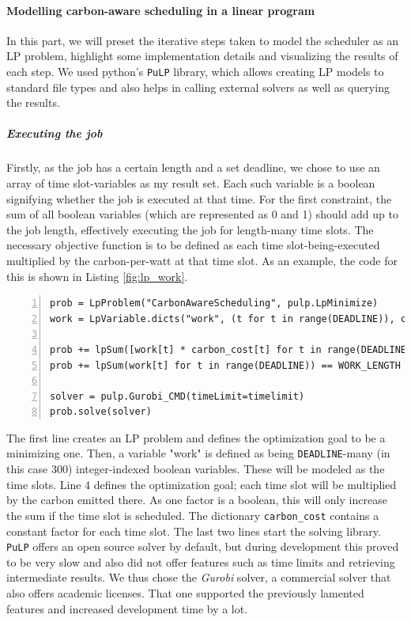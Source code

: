 \paragraph{Modelling carbon-aware scheduling in a linear program}

In this part, we will preset the iterative steps taken to model the scheduler as an LP problem, highlight some implementation details and visualizing the results of each step.
We used python's \verb|PuLP| library, which allows creating LP models to standard file types and also helps in calling external solvers as well as querying the results.

\subparagraph{Executing the job}

Firstly, as the job has a certain length and a set deadline, we chose to use an array of time slot-variables as my result set. Each such variable is a boolean signifying whether the job is executed at that time.
For the first constraint, the sum of all boolean variables (which are represented as 0 and 1) should add up to the job length, effectively executing the job for length-many time slots.
The necessary objective function is to be defined as each time slot-being-executed multiplied by the carbon-per-watt at that time slot.
As an example, the code for this is shown in Listing \ref{fig:lp_work}.

\begin{minipage}{\linewidth}
\begin{lstlisting}[frame=single, numbers=left, caption={LP Implementation for basic scheduling}, label={list:lp_work}, basicstyle=\ttfamily, breaklines]
prob = LpProblem("CarbonAwareScheduling", pulp.LpMinimize)
work = LpVariable.dicts("work", (t for t in range(DEADLINE)), cat="Binary")

prob += lpSum([work[t] * carbon_cost[t] for t in range(DEADLINE)]) 
prob += lpSum(work[t] for t in range(DEADLINE)) == WORK_LENGTH 

solver = pulp.Gurobi_CMD(timeLimit=timelimit)
prob.solve(solver)
\end{lstlisting}
\end{minipage}

The first line creates an LP problem and defines the optimization goal to be a minimizing one. 
Then, a variable "work" is defined as being \verb|DEADLINE|-many (in this case 300) integer-indexed boolean variables. 
These will be modeled as the time slots.
Line 4 defines the optimization goal; each time slot will be multiplied by the carbon emitted there. As one factor is a boolean, this will only increase the sum if the time slot is scheduled. The dictionary \verb|carbon_cost| contains a constant factor for each time slot.
The last two lines start the solving library. 
\verb|PuLP| offers an open source solver by default, but during development this proved to be very slow and also did not offer features such as time limits and retrieving intermediate results.
We thus chose the \emph{Gurobi} solver, a commercial solver that also offers academic licenses. 
That one supported the previously lamented features and increased development time by a lot. 

